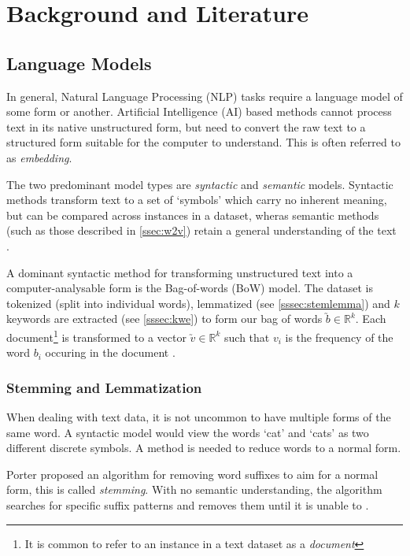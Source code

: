 \section{Background and Literature}\label{sec:lit}

\subsection{Language Models}\label{ssec:kwe}
In general, Natural Language Processing (NLP) tasks require a language model of some form or another.
Artificial Intelligence (AI) based methods cannot process text in its native unstructured form, but need to convert the
raw text to a structured form suitable for the computer to understand. This is often referred to as \emph{embedding}.

The two predominant model types are \emph{syntactic} and \emph{semantic} models. 
Syntactic methods transform text to a set of `symbols' which carry no inherent meaning, but can be 
compared across instances in a dataset, wheras semantic methods (such as those described in \autoref{ssec:w2v})
retain a general understanding of the text \cite{Cambria2014}.

A dominant syntactic method for transforming unstructured text into a computer-analysable form is the Bag-of-words 
(BoW) model. 
The dataset is tokenized (split into individual words), lemmatized (see \autoref{sssec:stemlemma})
and $k$ keywords are extracted (see \autoref{sssec:kwe}) to form our bag of words $\utilde{b}\in \mathbb{R} ^{k}$.
Each document\footnote{It is common to refer to an instance in a text dataset as a \emph{document}} is
transformed to a vector $\utilde{v}\in \mathbb{R} ^{k}$ such that $v_i$ is the frequency 
of the word $b_i$ occuring in the document \cite{Cambria2014, StevenBirdEwanKlein2009, Zhang2010}.

\subsubsection{Stemming and Lemmatization}\label{sssec:stemlemma}
When dealing with text data, it is not uncommon to have multiple forms of the same word.  A syntactic model would view
the words `cat' and `cats' as two different discrete symbols.  A method is needed to reduce words to a normal form.

Porter proposed an algorithm for removing word suffixes to aim for a normal form, this is called
\emph{stemming}. With no semantic understanding, the algorithm searches for specific suffix patterns and removes them
until it is unable to \cite{Porter1980}.

